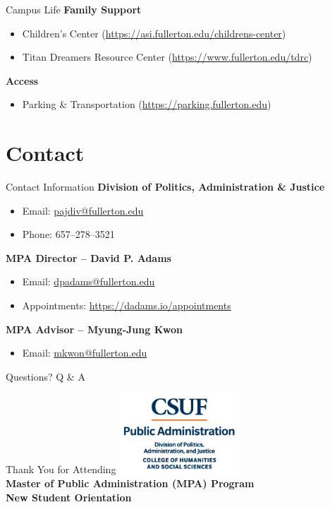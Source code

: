 \documentclass[10pt]{beamer}
\begin{document}
\begin{frame}{Campus Life}
\textbf{Family Support}
\begin{itemize}
  \item Children's Center \small(\url{https://asi.fullerton.edu/childrens-center})
  \item Titan Dreamers Resource Center \small(\url{https://www.fullerton.edu/tdrc})
\end{itemize}

\textbf{Access}
\begin{itemize}
  \item Parking \& Transportation \small(\url{https://parking.fullerton.edu})
\end{itemize}
\end{frame}

\section{Contact}
\begin{frame}{Contact Information}
\textbf{Division of Politics, Administration \& Justice}\\[-2pt]
\begin{itemize}
  \item Email: \href{mailto:pajdiv@fullerton.edu}{pajdiv@fullerton.edu}
  \item Phone: 657–278–3521
\end{itemize}

\textbf{MPA Director – David P. Adams}\\[-2pt]
\begin{itemize}
  \item Email: \href{mailto:dpadams@fullerton.edu}{dpadams@fullerton.edu}
  \item Appointments: \url{https://dadams.io/appointments}
\end{itemize}

\textbf{MPA Advisor – Myung-Jung Kwon}\\[-2pt]
\begin{itemize}
  \item Email: \href{mailto:mkwon@fullerton.edu}{mkwon@fullerton.edu}
\end{itemize}
\end{frame}

\begin{frame}[standout]{Questions?}
Q \& A
\end{frame}

\begin{frame}{Thank You for Attending}
\centering
\includegraphics[height=3cm]{images/PUBLIC-ADMINISTRATION-color.png}\\[10pt]
\textbf{Master of Public Administration (MPA) Program}\\
\textbf{New Student Orientation}
\end{frame}
\end{document}
